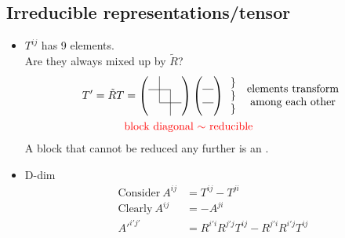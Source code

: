 \documentclass[11pt,fleqn]{book} %
\begin{document}
\subsection{Irreducible representations/tensor}
\begin{itemize}
\item \(T^{ij}\) has 9 elements. \\
  Are they always mixed up by \(\tilde{R}\)?\\
  \begin{align*}
    T' = \tilde{R} T &= \left( \begin{array}{*{3}{c}}
                                 \multicolumn{1}{l|}{} & &  \\ \cline{1-2}
                                                       & \multicolumn{1}{|l|}{} &  \\ \cline{2-3}
                                                       & &\multicolumn{1}{|l}{} \\
                               \end{array} \right)
    \left( \begin{array}{c}
             \\ \hline
             \\ \hline
             \\
           \end{array} \right)
    \begin{array}{c}
      \}\\
      \}\\
      \}
    \end{array}
    \begin{array}{c}
      \text{elements transform} \\
      \text{among each other}
    \end{array} \\
                     &\text{\textcolor{red}{block diagonal \(\sim\) reducible}}
  \end{align*}
  A block that cannot be reduced any further is an .
\item D-dim
  \begin{align*}
    \text{Consider} \ A^{ij}     &= T^{ij} - T^{ji}                                    \\
    \text{Clearly} \ A^{ij}      &= - A^{ji}                                           \\
    A'^{i'j'}                    &= R^{i'i} R^{j'j} T^{ij} - R^{j'i} R^{i'j} T^{ij}    \\

\end{align*}
\end{itemize}
\end{document}

